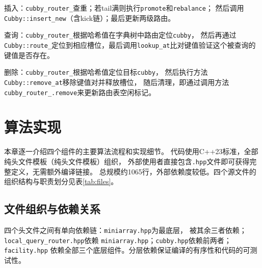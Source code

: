 \documentclass[
    type = bachelor,
    fontset = win,
    decl-page = true,
  ]{njuthesis}
\begin{document}
插入：\texttt{cubby\_router\_}查重；若tail满则执行\texttt{promote}和\texttt{rebalance}；
然后调用\texttt{Cubby::insert\_new}（含kick链）；最后更新两级路由。

查询：\texttt{cubby\_router\_}根据哈希值在字典树中路由定位\texttt{cubby}，
然后再通过
\texttt{Cubby::route\_}定位到相应槽位，最后调用\texttt{lookup\_at}比对键值验证这个被查询的键值是否存在。

删除：\texttt{cubby\_router\_}根据哈希值定位目标\texttt{cubby}，
然后执行方法\newline
\texttt{Cubby::remove\_at}移除键值对并释放槽位，
随后清理，即通过调用方法\newline
\texttt{cubby\_router\_.remove}来更新路由表空闲标记。

\chapter{算法实现}

本章逐一介绍四个组件的主要算法流程和实现细节。
代码使用C++23标准，全部纯头文件模板（纯头文件模板）组织，
外部使用者直接包含\texttt{.hpp}文件即可获得完整定义，无需额外编译链接。
总规模约1065行，外部依赖度较低。四个源文件的组织结构与职责划分见表\ref{tab:files}。

\section{文件组织与依赖关系}

\begin{table}[H]
\centering
{}
\caption{源代码文件组织}
\label{tab:files}
\end{table}

\noindent 四个头文件之间有单向依赖链：\texttt{miniarray.hpp}为最底层，
被其余三者依赖；\texttt{local\_query\_router.hpp}依赖
\texttt{miniarray.hpp}；\texttt{cubby.hpp}依赖前两者；\texttt{facility.hpp}
依赖全部三个底层组件。分层依赖保证编译的有序性和代码的可测试性。
\end{document}
